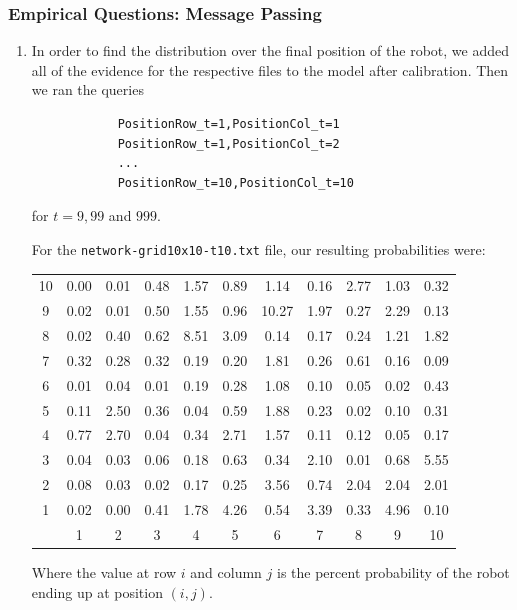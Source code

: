 \documentclass[11pt,a4paper]{article}
\begin{document}
	\setcounter{subsubsection}{4}
	\subsubsection{Empirical Questions: Message Passing}
	
	\begin{enumerate}
		\item In order to find the distribution over the final position of the robot, we added
		all of the evidence for the respective files to the model after calibration. Then we ran
		the queries
		\begin{verbatim}
		    PositionRow_t=1,PositionCol_t=1
		    PositionRow_t=1,PositionCol_t=2
		    ...
		    PositionRow_t=10,PositionCol_t=10
		\end{verbatim}
		for $t = 9, 99$ and $999$.
		
		For the {\tt network-grid10x10-t10.txt} file, our resulting probabilities were:
		\begin{center}
			\begin{tabular}{|c|cccccccccc|}
				\hline
				10 & 0.00 & 0.01 & 0.48 & 1.57 & 0.89 & 1.14 & 0.16 & 2.77 & 1.03 & 0.32 \\
				9 & 0.02 & 0.01 & 0.50 & 1.55 & 0.96 & 10.27 & 1.97 & 0.27 & 2.29 & 0.13 \\
				8 & 0.02 & 0.40 & 0.62 & 8.51 & 3.09 & 0.14 & 0.17 & 0.24 & 1.21 & 1.82 \\
				7 &0.32 & 0.28 & 0.32 & 0.19 & 0.20 & 1.81 & 0.26 & 0.61 & 0.16 & 0.09 \\
				6 & 0.01 & 0.04 & 0.01 & 0.19 & 0.28 & 1.08 & 0.10 & 0.05 & 0.02 & 0.43 \\
				5 & 0.11 & 2.50 & 0.36 & 0.04 & 0.59 & 1.88 & 0.23 & 0.02 & 0.10 & 0.31 \\
				4 & 0.77 & 2.70 & 0.04 & 0.34 & 2.71 & 1.57 & 0.11 & 0.12 & 0.05 & 0.17 \\
				3 & 0.04 & 0.03 & 0.06 & 0.18 & 0.63 & 0.34 & 2.10 & 0.01 & 0.68 & 5.55 \\
				2 & 0.08 & 0.03 & 0.02 & 0.17 & 0.25 & 3.56 & 0.74 & 2.04 & 2.04 & 2.01 \\
				1 & 0.02 & 0.00 & 0.41 & 1.78 & 4.26 & 0.54 & 3.39 & 0.33 & 4.96 & 0.10 \\
				\hline
				 & 1 & 2 & 3 & 4 & 5 & 6 & 7 & 8 & 9 & 10 \\
				 \hline
			\end{tabular}
		\end{center}
		Where the value at row $i$ and column $j$ is the percent probability of the
		robot ending up at position $(i,j)$.


\end{enumerate}
\end{document}
